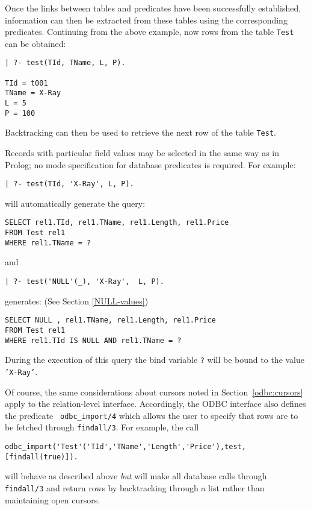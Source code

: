 Once the links between tables and predicates have been successfully established, 
information can then be extracted from these tables using the corresponding 
predicates.   Continuing from the above example, now rows from the table 
{\tt Test} can be obtained:
%
\begin{verbatim}
| ?- test(TId, TName, L, P).

TId = t001
TName = X-Ray
L = 5
P = 100 
\end{verbatim}
%
Backtracking can then be used to retrieve the next row of the table {\tt Test}.

Records with particular field values may be selected in the same way
as in Prolog; no mode specification for database predicates is
required. For example:
%
\begin{verbatim}
| ?- test(TId, 'X-Ray', L, P).
\end{verbatim}
will automatically generate the query:
\begin{verbatim}
SELECT rel1.TId, rel1.TName, rel1.Length, rel1.Price
FROM Test rel1
WHERE rel1.TName = ?
\end{verbatim}
and 
\begin{verbatim}
| ?- test('NULL'(_), 'X-Ray',  L, P).
\end{verbatim}
generates: (See Section \ref{NULL-values})
\begin{verbatim}
SELECT NULL , rel1.TName, rel1.Length, rel1.Price
FROM Test rel1
WHERE rel1.TId IS NULL AND rel1.TName = ?
\end{verbatim}
%
During the execution of this query the bind variable {\tt ?} will be bound
to the value {\tt 'X-Ray'}.\newline

Of course, the same considerations about cursors noted in
Section~\ref{odbc:cursors} apply to the relation-level interface.
Accordingly, the ODBC interface also defines the predicate {\tt
odbc\_import/4} which allows the user to specify that rows are to be
fetched through {\tt findall/3}.  For example, the call 
%
\begin{verbatim}
odbc_import('Test'('TId','TName','Length','Price'),test,[findall(true)]).
\end{verbatim}
will behave as described above {\em but} will make all database calls
through {\tt findall/3} and return rows by backtracking through a list
rather than maintaining open cursors.


